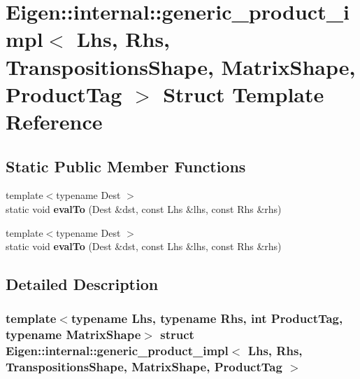 \hypertarget{struct_eigen_1_1internal_1_1generic__product__impl_3_01_lhs_00_01_rhs_00_01_transpositions_shapea83c7854330208d83886265b658a092d}{}\section{Eigen\+:\+:internal\+:\+:generic\+\_\+product\+\_\+impl$<$ Lhs, Rhs, Transpositions\+Shape, Matrix\+Shape, Product\+Tag $>$ Struct Template Reference}
\label{struct_eigen_1_1internal_1_1generic__product__impl_3_01_lhs_00_01_rhs_00_01_transpositions_shapea83c7854330208d83886265b658a092d}
\subsection*{Static Public Member Functions}
\begin{DoxyCompactItemize}
\item 
\mbox{\label{struct_eigen_1_1internal_1_1generic__product__impl_3_01_lhs_00_01_rhs_00_01_transpositions_shapea83c7854330208d83886265b658a092d_a89af74dee7fbaa894b0f6957d41a4d15}} 
{\footnotesize template$<$typename Dest $>$ }\\static void {\bfseries eval\+To} (Dest \&dst, const Lhs \&lhs, const Rhs \&rhs)
\item 
\mbox{\label{struct_eigen_1_1internal_1_1generic__product__impl_3_01_lhs_00_01_rhs_00_01_transpositions_shapea83c7854330208d83886265b658a092d_a89af74dee7fbaa894b0f6957d41a4d15}} 
{\footnotesize template$<$typename Dest $>$ }\\static void {\bfseries eval\+To} (Dest \&dst, const Lhs \&lhs, const Rhs \&rhs)
\end{DoxyCompactItemize}


\subsection{Detailed Description}
\subsubsection*{template$<$typename Lhs, typename Rhs, int Product\+Tag, typename Matrix\+Shape$>$\newline
struct Eigen\+::internal\+::generic\+\_\+product\+\_\+impl$<$ Lhs, Rhs, Transpositions\+Shape, Matrix\+Shape, Product\+Tag $>$}




